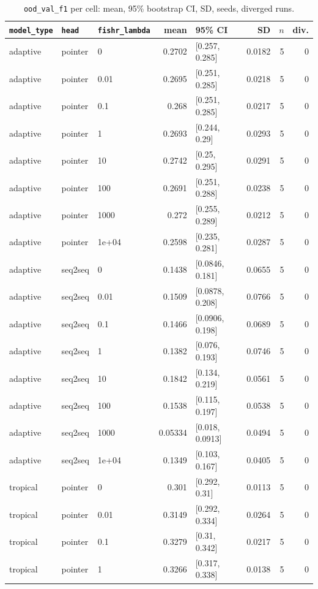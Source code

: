\documentclass[10pt]{article}
\begin{document}
{\small
\begin{longtable}{lllrlrrr}
\caption{\texttt{ood\_val\_f1} per cell: mean, 95\% bootstrap CI, SD, seeds, diverged runs.}\label{tab:summary-ood_val_f1}\\
\toprule
\texttt{model\_type} & \texttt{head} & \texttt{fishr\_lambda} & mean & 95\% CI & SD & $n$ & div.\\
\midrule
\endhead
adaptive & pointer & 0 & 0.2702 & [0.257, 0.285] & 0.0182 & 5 & 0\\
adaptive & pointer & 0.01 & 0.2695 & [0.251, 0.285] & 0.0218 & 5 & 0\\
adaptive & pointer & 0.1 & 0.268 & [0.251, 0.285] & 0.0217 & 5 & 0\\
adaptive & pointer & 1 & 0.2693 & [0.244, 0.29] & 0.0293 & 5 & 0\\
adaptive & pointer & 10 & 0.2742 & [0.25, 0.295] & 0.0291 & 5 & 0\\
adaptive & pointer & 100 & 0.2691 & [0.251, 0.288] & 0.0238 & 5 & 0\\
adaptive & pointer & 1000 & 0.272 & [0.255, 0.289] & 0.0212 & 5 & 0\\
adaptive & pointer & 1e+04 & 0.2598 & [0.235, 0.281] & 0.0287 & 5 & 0\\
adaptive & seq2seq & 0 & 0.1438 & [0.0846, 0.181] & 0.0655 & 5 & 0\\
adaptive & seq2seq & 0.01 & 0.1509 & [0.0878, 0.208] & 0.0766 & 5 & 0\\
adaptive & seq2seq & 0.1 & 0.1466 & [0.0906, 0.198] & 0.0689 & 5 & 0\\
adaptive & seq2seq & 1 & 0.1382 & [0.076, 0.193] & 0.0746 & 5 & 0\\
adaptive & seq2seq & 10 & 0.1842 & [0.134, 0.219] & 0.0561 & 5 & 0\\
adaptive & seq2seq & 100 & 0.1538 & [0.115, 0.197] & 0.0538 & 5 & 0\\
adaptive & seq2seq & 1000 & 0.05334 & [0.018, 0.0913] & 0.0494 & 5 & 0\\
adaptive & seq2seq & 1e+04 & 0.1349 & [0.103, 0.167] & 0.0405 & 5 & 0\\
tropical & pointer & 0 & 0.301 & [0.292, 0.31] & 0.0113 & 5 & 0\\
tropical & pointer & 0.01 & 0.3149 & [0.292, 0.334] & 0.0264 & 5 & 0\\
tropical & pointer & 0.1 & 0.3279 & [0.31, 0.342] & 0.0217 & 5 & 0\\
tropical & pointer & 1 & 0.3266 & [0.317, 0.338] & 0.0138 & 5 & 0\\

\end{longtable}}
\end{document}
